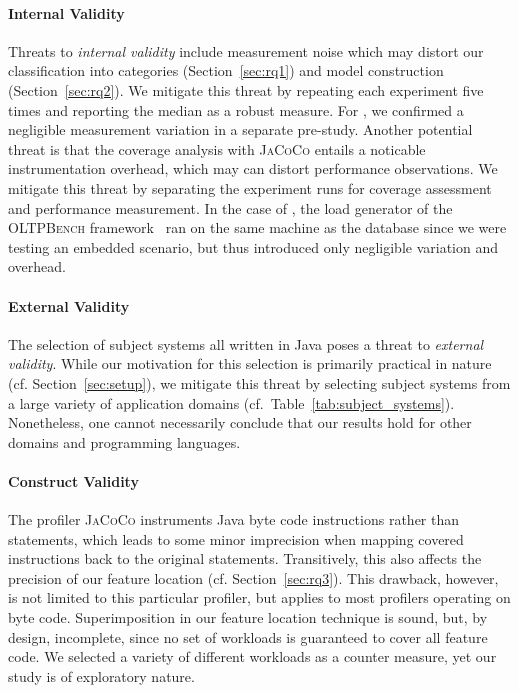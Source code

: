 \paragraph*{Internal Validity}\label{sec:internal_validity}
Threats to \emph{internal validity} include measurement noise which may distort our classification into categories (Section~\ref{sec:rq1}) and model construction (Section~\ref{sec:rq2}). We mitigate this threat by repeating each experiment five times and reporting the median as a robust measure. For \htwo, we confirmed a negligible measurement variation in a separate pre-study.
Another potential threat is that the coverage analysis with \mbox{\textsc{JaCoCo}} entails a noticable instrumentation overhead, which may can distort performance observations. We mitigate this threat by separating the experiment runs for coverage assessment and performance measurement. In the case of \htwo, the load generator of the \textsc{OLTPBench} framework~\cite{difallah_oltp_2013} ran on the same machine as the database since we were testing an embedded scenario, but thus introduced only negligible variation and overhead.
\paragraph*{External Validity}\label{sec:external_validity}
The selection of subject systems all written in Java poses a threat to \emph{external validity}. While our motivation for this selection is primarily practical in nature (cf. Section~\ref{sec:setup}), we mitigate this threat by selecting subject systems from a large variety of application domains (cf.~Table~\ref{tab:subject_systems}). Nonetheless, one cannot necessarily conclude that our results hold for other domains and programming languages. 
\paragraph{Construct Validity}\label{sec:construct_validity}
The profiler \textsc{JaCoCo} instruments Java byte code instructions rather than statements, which leads to some minor imprecision when mapping covered instructions back to the original statements. Transitively, this also affects the precision of our feature location (cf. Section~\ref{sec:rq3}). This drawback, however, is not limited to this particular profiler, but applies to most profilers operating on byte code. 
Superimposition in our feature location technique is sound, but, by design, incomplete, since no set of workloads is guaranteed to cover all feature code. We selected a variety of different workloads as a counter measure, yet our study is of exploratory nature. 


